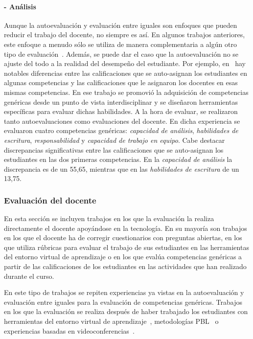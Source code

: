 \paragraph*{- Análisis}
Aunque la autoevaluación y evaluación entre iguales son enfoques que pueden reducir el trabajo del docente, no siempre es así. En algunos trabajos anteriores, este enfoque a menudo sólo se utiliza de manera complementaria a algún otro tipo de evaluación~\cite{lasa2013problem,sevilla2012assessment}. Además, se puede dar el caso que la autoevaluación no se ajuste del todo a la realidad del desempeño del estudiante. Por ejemplo, en~\cite{carreras2013promotion} hay notables diferencias entre las calificaciones que se auto-asignan los estudiantes en algunas competencias y las calificaciones que le asignaron los docentes en esas mismas competencias. En ese trabajo se promovió la adquisición de competencias genéricas desde un punto de vista interdisciplinar y se diseñaron herramientas específicas para evaluar dichas habilidades. A la hora de evaluar, se realizaron tanto autoevaluaciones como evaluaciones del docente. En dicha experiencia se evaluaron cuatro competencias genéricas: \emph{capacidad de análisis},  \emph{habilidades de escritura}, \emph{responsabilidad} y \emph{capacidad de trabajo en equipo}. Cabe destacar discrepancias significativas entre las calificaciones que se auto-asignan los estudiantes en las dos primeras competencias. En la \emph{capacidad de análisis} la discrepancia es de un 55,65\percentage, mientras que en las \emph{habilidades de escritura} de un 13,75\percentage.


\subsubsection*{Evaluación del docente}

En esta sección se incluyen trabajos en los que la evaluación la realiza directamente el docente apoyándose en la tecnología. En su mayoría son trabajos en los que el docente ha de corregir cuestionarios con preguntas abiertas, en los que utiliza rúbricas para evaluar el trabajo de sus estudiantes en las herramientas del entorno virtual de aprendizaje o en los que evalúa competencias genéricas a partir de las calificaciones de los estudiantes en las actividades que han realizado durante el curso. 

En este tipo de trabajos se repiten experiencias ya vistas en la autoevaluación y evaluación entre iguales para la evaluación de competencias genéricas. Trabajos en los que la evaluación se realiza después de haber trabajado los estudiantes con herramientas del entorno virtual de aprendizaje~\cite{starcic2008sustaining}, metodologías PBL~\cite{lacuesta2009active} o experiencias basadas en videoconferencias~\cite{ward2011developing}.

